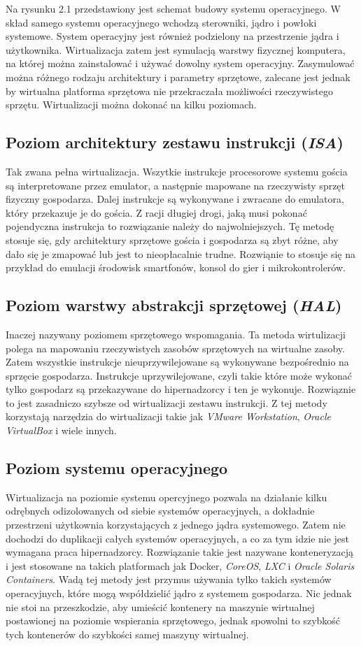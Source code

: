 \documentclass[polish, a4paper, 12pt, oneside]{book}
\begin{document}
Na rysunku 2.1 przedstawiony jest schemat budowy systemu operacyjnego. W skład samego systemu operacyjnego wchodzą sterowniki, jądro i powłoki systemowe. System operacyjny jest również podzielony na przestrzenie jądra i użytkownika. Wirtualizacja zatem jest symulacją warstwy fizycznej komputera, na której można zainstalować i używać dowolny system operacyjny. Zasymulować można różnego rodzaju architektury i parametry sprzętowe, zalecane jest jednak by wirtualna platforma sprzętowa nie przekraczała możliwości rzeczywistego sprzętu. Wirtualizacji można dokonać na kilku poziomach. 
\subsection {Poziom architektury zestawu instrukcji (\textit{ISA})}
Tak zwana pełna wirtualizacja. Wszytkie instrukcje procesorowe systemu gościa są interpretowane przez emulator, a następnie mapowane na rzeczywisty sprzęt fizyczny gospodarza. Dalej instrukcje są wykonywane i zwracane do emulatora, który przekazuje je do gościa. Z racji długiej drogi, jaką musi pokonać pojendyczna instrukcja to rozwiązanie należy do najwolniejszych. Tę metodę stosuje się, gdy architektury sprzętowe gościa i gospodarza są zbyt różne, aby dało się je zmapować lub jest to nieopłacalnie trudne. Rozwiąnie to stosuje się na przykład do emulacji środowisk smartfonów, konsol do gier i mikrokontrolerów.
\subsection {Poziom warstwy abstrakcji sprzętowej (\textit{HAL})}
Inaczej nazywany poziomem sprzętowego wspomagania. Ta metoda wirtulizacji polega na mapowaniu rzeczywistych zasobów sprzętowych na wirtualne zasoby. Zatem wszystkie instrukcje nieuprzywilejowane są wykonywane bezpośrednio na sprzęcie gospodarza. Instrukcje uprzywilejowane, czyli takie które może wykonać tylko gospodarz są przekazywane do hipernadzorcy i ten je wykonuje. Rozwiąznie to jest zasadniczo szybsze od wirtualizacji zestawu instrukcji. Z tej metody korzystają narzędzia do wirtualizacji takie jak \textit{VMware Workstation}\cite{vmwareworkstation}, \textit{Oracle VirtualBox}\cite{virtualbox} i wiele innych.
\subsection {Poziom systemu operacyjnego}
Wirtualizacja na poziomie systemu opercyjnego pozwala na działanie kilku odrębnych odizolowanych od siebie systemów operacyjnych, a dokładnie przestrzeni użytkownia korzystających z jednego jądra systemowego. Zatem nie dochodzi do duplikacji całych systemów operacyjnych, a co za tym idzie nie jest wymagana praca hipernadzorcy. Rozwiązanie takie jest nazywane konteneryzacją i jest stosowane na takich platformach jak Docker, \textit{CoreOS}\cite{coreos}, \textit{LXC}\cite{lxc} i \textit{Oracle Solaris Containers}\cite{solaris}. Wadą tej metody jest przymus używania tylko takich systemów operacyjnych, które mogą współdzielić jądro z systemem gospodarza. Nic jednak nie stoi na przeszkodzie, aby umieścić kontenery na maszynie wirtualnej postawionej na poziomie wspierania sprzętowego, jednak spowolni to szybkość tych kontenerów do szybkości samej maszyny wirtualnej. 
\end{document}
